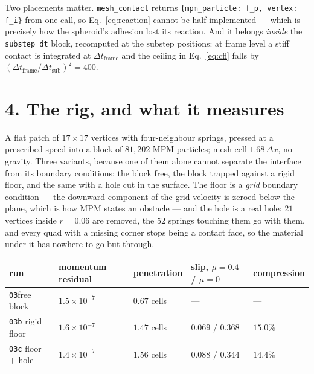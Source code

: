 \documentclass[10pt,a4paper]{article}
\newcommand{\code}[1]{\texttt{#1}}
\begin{document}
Two placements matter. \code{mesh\_contact} returns \code{\{mpm\_particle: f\_p, vertex: f\_i\}} from one
call, so Eq.~\eqref{eq:reaction} cannot be half-implemented --- which is precisely how the spheroid's
adhesion lost its reaction. And it belongs \emph{inside} the \code{substep\_dt} block, recomputed at the
substep positions: at frame level a stiff contact is integrated at $\Delta t_{\text{frame}}$ and the
ceiling in Eq.~\eqref{eq:cfl} falls by $(\Delta t_{\text{frame}}/\Delta t_{\text{sub}})^2=400$.

\section*{4.\; The rig, and what it measures}

A flat patch of $17\times17$ vertices with four-neighbour springs, pressed at a prescribed speed into a
block of $81{,}202$ MPM particles; mesh cell $1.68\,\Delta x$, no gravity. Three variants, because one
of them alone cannot separate the interface from its boundary conditions: the block free, the block
trapped against a rigid floor, and the same with a hole cut in the surface. The floor is a \emph{grid}
boundary condition --- the downward component of the grid velocity is zeroed below the plane, which is
how MPM states an obstacle --- and the hole is a real hole: $21$ vertices inside $r=0.06$ are removed,
the $52$ springs touching them go with them, and every quad with a missing corner stops being a contact
face, so the material under it has nowhere to go but through.

\begin{center}\small
\begin{tabular}{@{}lllll@{}}\toprule
run & momentum residual & penetration & slip, $\mu=0.4$ / $\mu=0$ & compression\\\midrule
\code{03}\quad free block            & $1.5\times10^{-7}$ & $0.67$ cells & --- & ---\\
\code{03b}\; rigid floor             & $1.6\times10^{-7}$ & $1.47$ cells & $0.069$ / $0.368$ & $15.0\%$\\
\code{03c}\; floor $+$ hole          & $1.4\times10^{-7}$ & $1.56$ cells & $0.088$ / $0.344$ & $14.4\%$\\
\bottomrule
\end{tabular}
\end{center}
\end{document}
